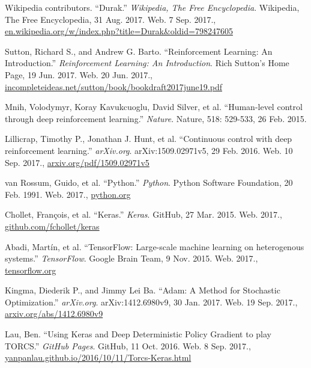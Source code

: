 \documentclass[a4paper,titlepage]{article}
\begin{document}
\begin{thebibliography}{9}

  Wikipedia contributors. ``Durak.'' \emph{Wikipedia, The Free Encyclopedia}. Wikipedia, The Free Encyclopedia, 31 Aug. 2017. Web.
  7 Sep. 2017., \\
  \url{en.wikipedia.org/w/index.php?title=Durak&oldid=798247605}

  Sutton, Richard S., and Andrew G. Barto. ``Reinforcement Learning: An Introduction.'' \emph{Reinforcement Learning: An Introduction}. Rich Sutton's Home Page, 19 Jun. 2017. Web.
  20 Jun. 2017., \\
  \url{incompleteideas.net/sutton/book/bookdraft2017june19.pdf}

  Mnih, Volodymyr, Koray Kavukcuoglu, David Silver, et al. ``Human-level control through deep reinforcement learning.'' \emph{Nature}. Nature, 518: 529-533, 26 Feb. 2015.

  Lillicrap, Timothy P., Jonathan J. Hunt, et al. ``Continuous control with deep reinforcement learning.'' \emph{arXiv.org}. arXiv:1509.02971v5, 29 Feb. 2016. Web.
  10 Sep. 2017.,
  \url{arxiv.org/pdf/1509.02971v5}

  van Rossum, Guido, et al. ``Python.'' \emph{Python}. Python Software Foundation, 20 Feb. 1991. Web.
  2017.,
  \url{python.org}

  Chollet, Fran\c{c}ois, et al. ``Keras.'' \emph{Keras}. GitHub, 27 Mar. 2015. Web.
  2017.,
  \url{github.com/fchollet/keras}

  Abadi, Martín, et al. ``TensorFlow: Large-scale machine learning on heterogenous systems.'' \emph{TensorFlow}. Google Brain Team, 9 Nov. 2015. Web.
  2017.,
  \url{tensorflow.org}

  Kingma, Diederik P., and Jimmy Lei Ba. ``Adam: A Method for Stochastic Optimization.'' \emph{arXiv.org}. arXiv:1412.6980v9, 30 Jan. 2017. Web.
  19 Sep. 2017.,
  \url{arxiv.org/abs/1412.6980v9}

  Lau, Ben. ``Using Keras and Deep Deterministic Policy Gradient to play TORCS.'' \emph{GitHub Pages}. GitHub, 11 Oct. 2016. Web.
  8 Sep. 2017., \\
  \url{yanpanlau.github.io/2016/10/11/Torcs-Keras.html}

\end{thebibliography}
\end{document}
